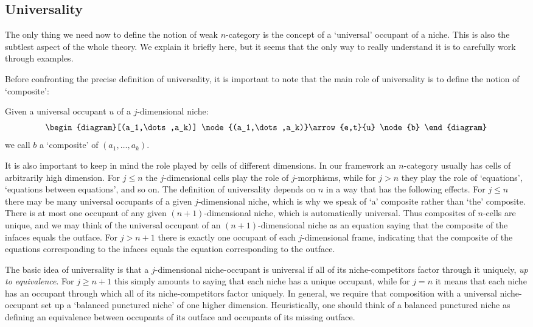 \subsection{Universality} 

The only thing we need now to define the notion of weak $n$-category is
the concept of a `universal' occupant of a niche.  This is also the
subtlest aspect of the whole theory.  We explain it briefly here,
but it seems that the only way to really understand it is to carefully
work through examples.  

Before confronting the precise definition of universality, it is
important to note that the main role of universality is to define the
notion of `composite':

\begin{defn}\et  Given a universal occupant $u$ of a $j$-dimensional niche:
\[
\begin{diagram}[(a_1,\dots,a_k)]
\node{(a_1,\dots,a_k)}\arrow{e,t}{u} \node{b}
\end{diagram}
\]
we call $b$ a `composite' of $(a_{1},\dots,a_{k})$.
\end{defn}

It is also important to keep in mind the role played by cells of
different dimensions.  In our framework an $n$-category usually has
cells of arbitrarily high dimension.  For $j \le n$ the $j$-dimensional
cells play the role of $j$-morphisms, while for $j > n$ they play the
role of `equations', `equations between equations', and so on.  The
definition of universality depends on $n$ in a way that has the
following effects.  For $j \le n$ there may be many universal occupants
of a given $j$-dimensional niche, which is why we speak of `a' composite
rather than `the' composite.  There is at most one occupant of any given
$(n+1)$-dimensional niche, which is automatically universal.  Thus
composites of $n$-cells are unique, and we may think of the universal
occupant of an $(n+1)$-dimensional niche as an equation saying that the
composite of the infaces equals the outface.  For $j > n + 1$ there is
exactly one occupant of each $j$-dimensional frame, indicating that the
composite of the equations corresponding to the infaces equals the
equation corresponding to the outface.

The basic idea of universality is that a $j$-dimensional niche-occupant
is universal if all of its niche-competitors factor through it uniquely,
{\it up to equivalence}.  For $j \ge n+1$ this simply amounts to saying
that each niche has a unique occupant, while for $j = n$ it means that
each niche has an occupant through which all of its niche-competitors
factor uniquely.  In general, we require that composition with a
universal niche-occupant set up a `balanced punctured niche' of one
higher dimension.  Heuristically, one should think of a balanced
punctured niche as defining an equivalence between occupants of its
outface and occupants of its missing outface.

